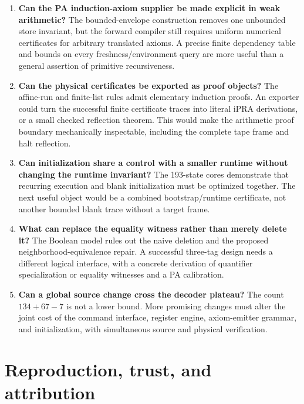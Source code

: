\documentclass[10pt,letterpaper]{article}
\begin{document}
\begin{enumerate}
\item \textbf{Can the PA induction-axiom supplier be made explicit in
weak arithmetic?} The bounded-envelope construction removes one
unbounded store invariant, but the forward compiler still requires
uniform numerical certificates for arbitrary translated axioms. A
precise finite dependency table and bounds on every freshness/environment
query are more useful than a general assertion of primitive recursiveness.

\item \textbf{Can the physical certificates be exported as proof objects?}
The affine-run and finite-list rules admit elementary induction proofs.
An exporter could turn the successful finite certificate traces into
literal iPRA derivations, or a small checked reflection theorem. This
would make the arithmetic proof boundary mechanically inspectable,
including the complete tape frame and halt reflection.

\item \textbf{Can initialization share a control with a smaller runtime
without changing the runtime invariant?} The 193-state cores demonstrate
that recurring execution and blank initialization must be optimized
together. The next useful object would be a combined bootstrap/runtime
certificate, not another bounded blank trace without a target frame.

\item \textbf{What can replace the equality witness rather than merely
delete it?} The Boolean model rules out the naive deletion and the
proposed neighborhood-equivalence repair. A successful three-tag design
needs a different logical interface, with a concrete derivation of
quantifier specialization or equality witnesses and a PA calibration.

\item \textbf{Can a global source change cross the decoder plateau?}
The count $134+67-7$ is not a lower bound. More promising changes must
alter the joint cost of the command interface, register engine,
axiom-emitter grammar, and initialization, with simultaneous source
and physical verification.
\end{enumerate}

\section{Reproduction, trust, and attribution}
\end{document}
